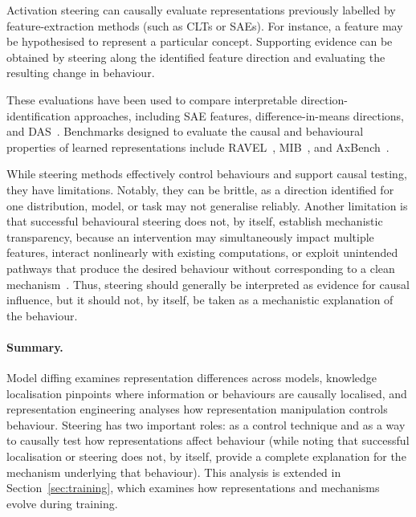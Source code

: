 Activation steering can causally evaluate representations previously labelled by feature-extraction methods (such as CLTs or SAEs). For instance, a feature may be hypothesised to represent a particular concept. Supporting evidence can be obtained by steering along the identified feature direction and evaluating the resulting change in behaviour. 

These evaluations have been used to compare interpretable direction-identification approaches, including SAE features, difference-in-means directions, and DAS~. 
Benchmarks designed to evaluate the causal and behavioural properties of learned representations include RAVEL~, MIB~, and AxBench~.

\begin{warningbox}
While steering methods effectively control behaviours and support causal testing, they have limitations. Notably, they can be brittle, as a direction identified for one distribution, model, or task may not generalise reliably. Another limitation is that successful behavioural steering does not, by itself, establish mechanistic transparency, because an intervention may simultaneously impact multiple features, interact nonlinearly with existing computations, or exploit unintended pathways that produce the desired behaviour without corresponding to a clean mechanism~. Thus, steering should generally be interpreted as evidence for causal influence, but it should not, by itself, be taken as a mechanistic explanation of the behaviour.
\end{warningbox}


\paragraph{Summary.} Model diffing examines representation differences across models, knowledge localisation pinpoints where information or behaviours are causally localised, and representation engineering analyses how representation manipulation controls behaviour. Steering has two important roles: as a control technique and as a way to causally test how representations affect behaviour (while noting that successful localisation or steering does not, by itself, provide a complete explanation for the mechanism underlying that behaviour). This analysis is extended in Section~\ref{sec:training}, which examines how representations and mechanisms evolve during training.
